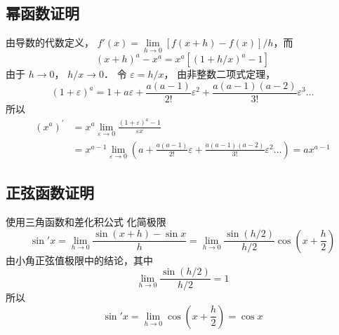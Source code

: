 \subsection{幂函数证明}
由导数的代数定义， $f'\left( x \right) = \mathop {\lim }\limits_{h \to 0} [{f\left( {x + h} \right) - f\left( x \right)}]/{h}$，而
\begin{equation}
{\left( {x + h} \right)^a} - {x^a} = {x^a}[{\left( {1 + h/x} \right)^a} - 1]
\end{equation}
由于 $h \to 0$，  $h/x \to 0$． 令 $\varepsilon  = h/x$， 由非整数二项式定理，
\begin{equation}
{\left( {1 + \varepsilon } \right)^a} = 1 + a\varepsilon  + \frac{{a\left( {a - 1} \right)}}{{2!}}{\varepsilon ^2} + \frac{{a\left( {a - 1} \right)\left( {a - 2} \right)}}{{3!}}{\varepsilon ^3}\dots
\end{equation}
所以
\begin{equation}\begin{aligned}
{\left( {{x^a}} \right)^\prime } &= {x^a}\mathop {\lim }\limits_{\varepsilon  \to 0} \frac{{{{\left( {1 + \varepsilon } \right)}^a} - 1}}{{\varepsilon x}} \\
&= {x^{a - 1}}\mathop {\lim }\limits_{\varepsilon  \to 0} \left( {a + \frac{{a\left( {a - 1} \right)}}{{2!}}\varepsilon  + \frac{{a\left( {a - 1} \right)\left( {a - 2} \right)}}{{3!}}{\varepsilon ^2}\dots} \right) = a{x^{a - 1}}
\end{aligned}\end{equation}

\subsection{正弦函数证明}
使用三角函数和差化积公式%
化简极限
\begin{equation}
\sin'x = \mathop {\lim }\limits_{h \to 0} \frac{{\sin (x + h) - \sin x}}{h} = \mathop {\lim }\limits_{h \to 0} \frac{{\sin (h/2)}}{{h/2}}\cos \left( {x + \frac{h}{2}} \right)
\end{equation}
由小角正弦值极限中的结论，其中
\begin{equation}
\lim\limits_{h \to 0} \frac{\sin (h/2)}{h/2} = 1
\end{equation}
所以
\begin{equation}
\sin'x =  \mathop {\lim }\limits_{h \to 0}\cos \left( {x + \frac{h}{2}} \right) = \cos x
\end{equation}

